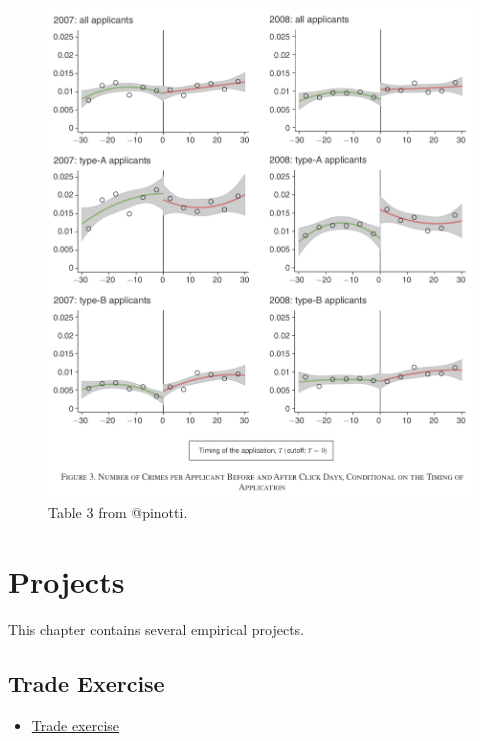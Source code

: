 \documentclass[]{book}
\providecommand{\tightlist}{%
  \setlength{\itemsep}{0pt}\setlength{\parskip}{0pt}}
\begin{document}
\begin{figure}

{\centering \includegraphics[width=19.53in]{images/pinotti2} 

}

\caption{Table 3 from @pinotti.}\label{fig:pin2}
\end{figure}

\hypertarget{projects}{%
\chapter{Projects}\label{projects}}

This chapter contains several empirical projects.

\hypertarget{trade-exercise}{%
\section{Trade Exercise}\label{trade-exercise}}

\begin{itemize}
\tightlist
\item
  \href{images/trade.html}{Trade exercise}
\end{itemize}


\end{document}
